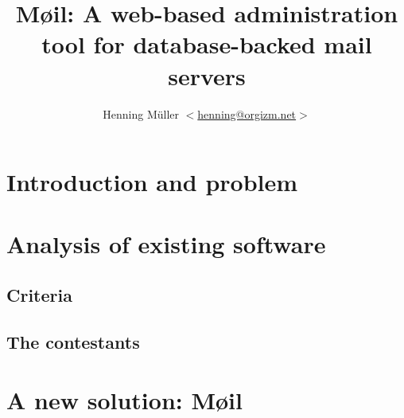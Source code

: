 \documentclass[12pt,a4paper]{scrartcl}
\begin{document}
	\title{Møil: A web-based administration tool for database-backed mail servers}
	\author{
		Henning Müller $<$\href{mailto:henning@orgizm.net}{henning@orgizm.net}$>$
	}
	\date{}

	\maketitle


	\section*{Introduction and problem}

	\section*{Analysis of existing software}

	\subsection*{Criteria}

	\subsection*{The contestants}

	\section*{A new solution: Møil}

	\printbibliography
\end{document}
